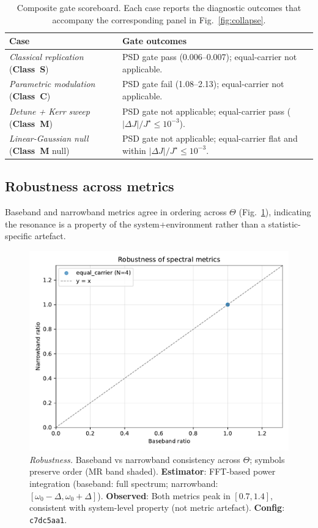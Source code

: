 \documentclass[11pt,letterpaper]{article}
\newcommand{\confighash}{c7dc5aa1}
\DeclareRobustCommand{\classS}{\textbf{Class~S}\xspace}
\DeclareRobustCommand{\classC}{\textbf{Class~C}\xspace}
\DeclareRobustCommand{\classM}{\textbf{Class~M}\xspace}
\begin{document}
\begin{table}[t]
\centering
\small
\caption{\label{tab:gate_scoreboard}Composite gate scoreboard. Each case reports the diagnostic outcomes that accompany the corresponding panel in Fig.~\ref{fig:collapse}.}
\begin{tabularx}{\linewidth}{@{}l Y@{}}
\toprule
Case & Gate outcomes \\
\midrule
\textit{Classical replication} (\classS) & PSD gate pass (0.006–0.007); equal-carrier not applicable. \\
\textit{Parametric modulation} (\classC) & PSD gate fail (1.08–2.13); equal-carrier not applicable. \\
\textit{Detune + Kerr sweep} (\classM) & PSD gate not applicable; equal-carrier pass ($|\Delta J|/J^\star \le 10^{-3}$). \\
\textit{Linear-Gaussian null} (\classM{} null) & PSD gate not applicable; equal-carrier flat and within $|\Delta J|/J^\star \le 10^{-3}$. \\
\bottomrule
\end{tabularx}
\end{table}

\subsection{Robustness across metrics}
\label{sec:results_robust}
Baseband and narrowband metrics agree in ordering across $\Theta$ (Fig.~\ref{fig:robustness}), indicating the resonance is a property of the system+environment rather than a statistic-specific artefact.

\begin{figure}[t]
\centering
\includegraphics[width=0.75\linewidth]{figC_robustness.pdf}
\caption{\label{fig:robustness}\emph{Robustness.} Baseband vs narrowband consistency across $\Theta$; symbols preserve order (MR band shaded). \textbf{Estimator}: FFT-based power integration (baseband: full spectrum; narrowband: $[\omega_0-\Delta,\omega_0+\Delta]$). \textbf{Observed}: Both metrics peak in $[0.7,1.4]$, consistent with system-level property (not metric artefact). \textbf{Config}: \texttt{\confighash}.}
\end{figure}
\end{document}
